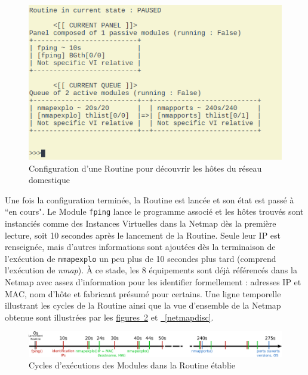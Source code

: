 \documentclass[]{article}
\newcommand{\wordlink}[2]{\hyperref[#1]{#2~\ref{#1}}}
\begin{document}
\vspace{0.2cm}

\begin{figure}[!ht]
\centering
     \includegraphics[width=0.5\linewidth]{routineDisc}
     \caption{Configuration d'une Routine pour découvrir les hôtes du réseau domestique}
     \label{routinedisc}
\end{figure}

\vspace{0.3cm}

\newpage

\par Une fois la configuration terminée, la Routine est lancée et son état est passé à ``en cours". Le Module \texttt{fping} lance le programme associé et les hôtes trouvés sont instanciés comme des Instances Virtuelles dans la Netmap dès la première lecture, soit 10 secondes après le lancement de la Routine. Seule leur IP est renseignée, mais d'autres informations sont ajoutées dès la terminaison de l'exécution de \texttt{nmapexplo} un peu plus de 10 secondes plus tard (comprend l'exécution de \textit{nmap}). À ce stade, les 8 équipements sont déjà référencés dans la Netmap avec assez d'information pour les identifier formellement : adresses IP et MAC, nom d'hôte et fabricant présumé pour certains. Une ligne temporelle illustrant les cycles de la Routine ainsi que la vue d'ensemble de la Netmap obtenue sont illustrées par les \wordlink{timeline}{figures} et \wordlink{netmapdisc}{}.

\begin{figure}[!ht]
\centering
     \includegraphics[width=\linewidth]{timeline}
     \caption{Cycles d'exécutions des Modules dans la Routine établie}
     \label{timeline}
\end{figure}

\vspace{0.3cm}
\end{document}
